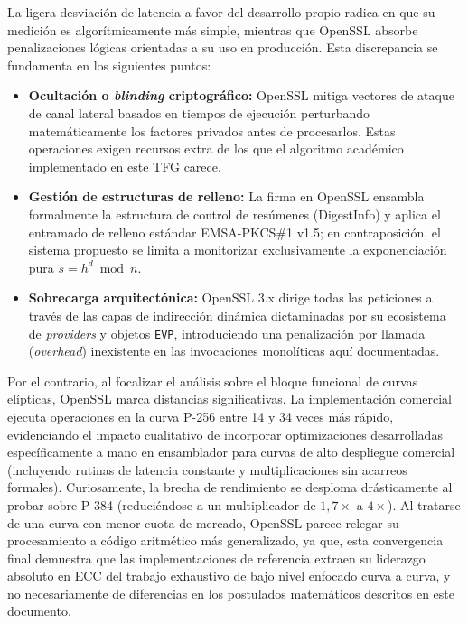 La ligera desviación de latencia a favor del desarrollo propio radica en que su medición es algorítmicamente más simple, mientras que OpenSSL absorbe penalizaciones lógicas orientadas a 
su uso en producción. Esta discrepancia se fundamenta en los siguientes puntos:
\begin{itemize}
    \item \textbf{Ocultación o \textit{blinding} criptográfico:} OpenSSL mitiga vectores de ataque de canal lateral basados en tiempos de ejecución perturbando matemáticamente los factores privados antes de procesarlos. Estas operaciones exigen recursos extra de los que el algoritmo académico implementado en este TFG carece.
    \item \textbf{Gestión de estructuras de relleno:} La firma en OpenSSL ensambla formalmente la estructura de control de resúmenes (DigestInfo) y aplica el entramado de relleno estándar EMSA-PKCS\#1 v1.5; en contraposición, el sistema propuesto se limita a monitorizar exclusivamente la exponenciación pura $s = h^d \bmod n$.
    \item \textbf{Sobrecarga arquitectónica:} OpenSSL 3.x dirige todas las peticiones a través de las capas de indirección dinámica dictaminadas por su ecosistema de \textit{providers} y objetos \texttt{EVP}, introduciendo una penalización por llamada (\textit{overhead}) inexistente en las invocaciones monolíticas aquí documentadas.
\end{itemize}

Por el contrario, al focalizar el análisis sobre el bloque funcional de curvas elípticas, OpenSSL marca distancias significativas. La implementación comercial ejecuta operaciones en la 
curva P-256 entre 14 y 34 veces más rápido, evidenciando el impacto cualitativo de incorporar optimizaciones desarrolladas específicamente a mano en ensamblador para curvas de alto 
despliegue comercial (incluyendo rutinas de latencia constante y multiplicaciones sin acarreos formales). Curiosamente, la brecha de rendimiento se desploma drásticamente al probar sobre 
P-384 (reduciéndose a un multiplicador de $1{,}7\times$ a $4\times$). Al tratarse de una curva con menor cuota de mercado, OpenSSL parece relegar su procesamiento a código aritmético más 
generalizado, ya que, esta convergencia final demuestra que las implementaciones de referencia extraen su liderazgo absoluto en ECC del trabajo exhaustivo de bajo nivel enfocado curva a curva, 
y no necesariamente de diferencias en los postulados matemáticos descritos en este documento.

